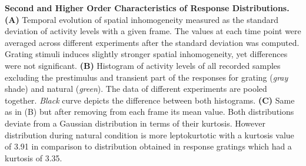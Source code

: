 \textbf{Second and Higher Order Characteristics of Response Distributions.}
\textbf{(A)} Temporal evolution of spatial inhomogeneity measured as the
standard deviation of activity levels with a given frame. The values at
each time point were averaged across different experiments after the
standard deviation was computed. Grating stimuli induces slightly stronger
spatial inhomogeneity, yet differences were not significant.  \textbf{(B)}
Histogram of activity levels of all recorded samples excluding the
prestimulus and transient part of the responses for grating (\textit{gray} shade)
and natural (\textit{green}). The data of different experiments are pooled
together. \textit{Black} curve depicts the difference between both
histograms. \textbf{(C)} Same as in (B) but after removing from each frame
its mean value. Both distributions deviate from a Gaussian distribution in
terms of their kurtosis. However distribution during natural condition is
more leptokurtotic with a kurtosis value of 3.91 in comparison to
distribution obtained in response gratings which had a kurtosis of 3.35. 


